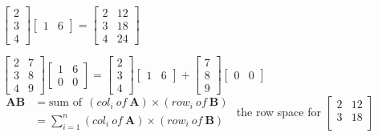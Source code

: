 \documentclass[12pt, a4paper]{article}
\begin{document}
{\begin{math}
\begin{bmatrix}
		2 \\
		3 \\
		4
	\end{bmatrix}
	\begin{bmatrix}
		1 & 6
	\end{bmatrix}
	 = 
	\begin{bmatrix}
		2 & 12 \\
		3 & 18 \\
		4 & 24 
	\end{bmatrix}
\end{math}
\par 
\begin{math}
	\begin{bmatrix}
		2 & 7 \\
		3 & 8 \\
		4 & 9 
	\end{bmatrix}
	\begin{bmatrix}
		1 & 6 \\
		0 & 0 
	\end{bmatrix}
	 = 
	\begin{bmatrix}
		2 \\
		3 \\
		4
	\end{bmatrix}
	\begin{bmatrix}
		1 & 6
	\end{bmatrix}
	 + 
	\begin{bmatrix}
		7 \\
		8 \\
		9
	\end{bmatrix}
	\begin{bmatrix}
		0 & 0
	\end{bmatrix}
\end{math}
\newline
\begin{math}
	\begin{aligned}
		{\mathbf{AB}} &= {\text{sum of}} \ \ (col_i \ of \ {\mathbf{A}}) \times (row_i \ of \ {\mathbf{B}}) \\
		&= \sum_{i=1}^{n}(col_i \ of \ {\mathbf{A}}) \times (row_i \ of \ {\mathbf{B}})
	\end{aligned}
\end{math}
\vspace{14pt}
\newline
{\textcolor{anhao-purple}{the row space}} for 
\begin{math}
	\begin{bmatrix}
		2 & 12 \\
		3 & 18 \\

\end{bmatrix}
\end{math}}
\end{document}
